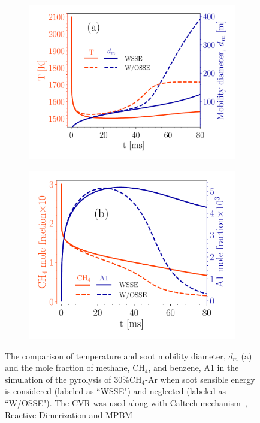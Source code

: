 \begin{figure}[H]
	\centering
	\begin{subfigure}[t]{0.43\textwidth}
		\includegraphics[width=1\textwidth]{Figures/Theory/sse_temp_dm.pdf}
	\end{subfigure}
	\begin{subfigure}[t]{0.4\textwidth}
		\includegraphics[width=1\textwidth]{Figures/Theory/sse_gasresid.pdf}
	\end{subfigure}
	\caption{The comparison of temperature and soot mobility diameter, $d_m$ (a) and the mole fraction of methane, $\mathrm{CH_4}$, and benzene, A1 in the simulation of the pyrolysis of 30\%$\mathrm{CH_4}$-Ar when soot sensible energy is considered (labeled as ``WSSE") and neglected (labeled as ``W/OSSE"). The CVR was used along with Caltech mechanism~\citep{blanquart2009chemical}, Reactive Dimerization and MPBM}
	\label{fig:sseeffect}
\end{figure}

